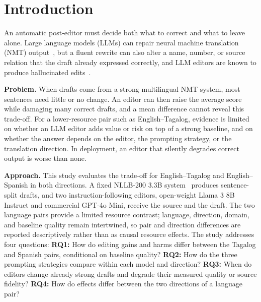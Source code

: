 \section{Introduction}
An automatic post-editor must decide both what to correct and what to leave alone. Large language models (LLMs) can repair neural machine translation (NMT) output~\cite{raunak2023,ki2024,treviso2024}, but a fluent rewrite can also alter a name, number, or source relation that the draft already expressed correctly, and LLM editors are known to produce hallucinated edits~\cite{raunak2023}.

\textbf{Problem.} When drafts come from a strong multilingual NMT system, most sentences need little or no change. An editor can then raise the average score while damaging many correct drafts, and a mean difference cannot reveal this trade-off. For a lower-resource pair such as English--Tagalog, evidence is limited on whether an LLM editor adds value or risk on top of a strong baseline, and on whether the answer depends on the editor, the prompting strategy, or the translation direction. In deployment, an editor that silently degrades correct output is worse than none.

\textbf{Approach.} This study evaluates the trade-off for English--Tagalog and English--Spanish in both directions. A fixed NLLB-200 3.3B system~\cite{nllb2022} produces sentence-split drafts, and two instruction-following editors, open-weight Llama 3 8B Instruct and commercial GPT-4o Mini, receive the source and the draft. The two language pairs provide a limited resource contrast; language, direction, domain, and baseline quality remain intertwined, so pair and direction differences are reported descriptively rather than as causal resource effects. The study addresses four questions:
\textbf{RQ1:} How do editing gains and harms differ between the Tagalog and Spanish pairs, conditional on baseline quality?
\textbf{RQ2:} How do the three prompting strategies compare within each model and direction?
\textbf{RQ3:} When do editors change already strong drafts and degrade their measured quality or source fidelity?
\textbf{RQ4:} How do effects differ between the two directions of a language pair?

